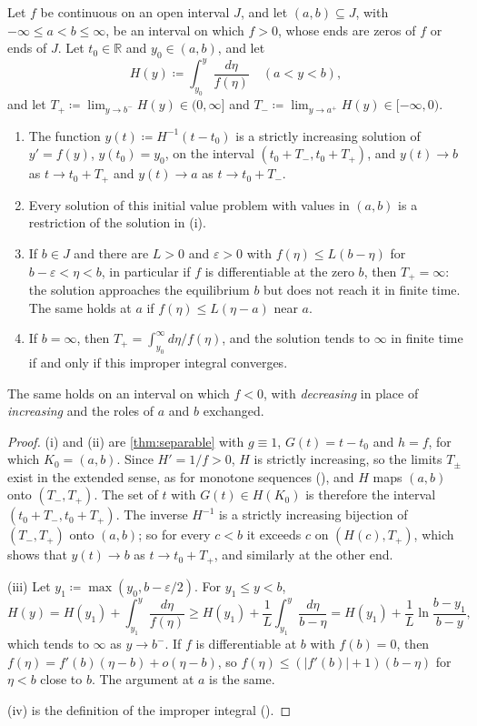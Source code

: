 \begin{theorem}
\label{thm:between-equilibria}
Let $f$ be continuous on an open interval $J$, and let $(a,b)\subseteq J$, with $-\infty\le a<b\le\infty$, be an interval on which $f>0$, whose ends are zeros of $f$ or ends of $J$. Let $t_0\in\mathbb R$ and $y_0\in(a,b)$, and let
\[
H(y)\coloneqq\int_{y_0}^y\frac{d\eta}{f(\eta)}\quad(a<y<b),
\]
and let $T_+\coloneqq\lim_{y\to b^-}H(y)\in(0,\infty]$ and $T_-\coloneqq\lim_{y\to a^+}H(y)\in[-\infty,0)$.
\begin{enumerate}
\item The function $y(t)\coloneqq H^{-1}(t-t_0)$ is a strictly increasing solution of $y'=f(y)$, $y(t_0)=y_0$, on the interval $(t_0+T_-,t_0+T_+)$, and $y(t)\to b$ as $t\to t_0+T_+$ and $y(t)\to a$ as $t\to t_0+T_-$.
\item Every solution of this initial value problem with values in $(a,b)$ is a restriction of the solution in (i).
\item If $b\in J$ and there are $L>0$ and $\varepsilon>0$ with $f(\eta)\le L(b-\eta)$ for $b-\varepsilon<\eta<b$, in particular if $f$ is differentiable at the zero $b$, then $T_+=\infty$: the solution approaches the equilibrium $b$ but does not reach it in finite time. The same holds at $a$ if $f(\eta)\le L(\eta-a)$ near $a$.
\item If $b=\infty$, then $T_+=\int_{y_0}^\infty d\eta/f(\eta)$, and the solution tends to $\infty$ in finite time if and only if this improper integral converges.
\end{enumerate}
The same holds on an interval on which $f<0$, with \emph{decreasing} in place of \emph{increasing} and the roles of $a$ and $b$ exchanged.
\end{theorem}

\begin{proof}
(i) and (ii) are \cref{thm:separable} with $g\equiv1$, $G(t)=t-t_0$ and $h=f$, for which $K_0=(a,b)$. Since $H'=1/f>0$, $H$ is strictly increasing, so the limits $T_\pm$ exist in the extended sense, as for monotone sequences (), and $H$ maps $(a,b)$ onto $(T_-,T_+)$. The set of $t$ with $G(t)\in H(K_0)$ is therefore the interval $(t_0+T_-,t_0+T_+)$. The inverse $H^{-1}$ is a strictly increasing bijection of $(T_-,T_+)$ onto $(a,b)$; so for every $c<b$ it exceeds $c$ on $(H(c),T_+)$, which shows that $y(t)\to b$ as $t\to t_0+T_+$, and similarly at the other end.

(iii) Let $y_1\coloneqq\max(y_0,b-\varepsilon/2)$. For $y_1\le y<b$,
\[
H(y)=H(y_1)+\int_{y_1}^y\frac{d\eta}{f(\eta)}\ge H(y_1)+\frac1L\int_{y_1}^y\frac{d\eta}{b-\eta}=H(y_1)+\frac1L\ln\frac{b-y_1}{b-y},
\]
which tends to $\infty$ as $y\to b^-$. If $f$ is differentiable at $b$ with $f(b)=0$, then $f(\eta)=f'(b)(\eta-b)+o(\eta-b)$, so $f(\eta)\le(|f'(b)|+1)(b-\eta)$ for $\eta<b$ close to $b$. The argument at $a$ is the same.

(iv) is the definition of the improper integral ().
\end{proof}


